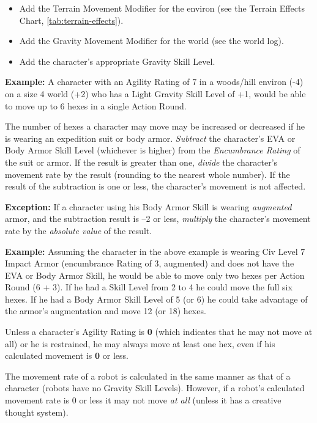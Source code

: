 \begin{itemize}
\item Add the Terrain Movement Modifier for the environ (see the
  Terrain Effects Chart, \ref{tab:terrain-effects}). 
\item Add the Gravity Movement Modifier for the world (see the world
  log). 
\item Add the character's appropriate Gravity Skill Level. 
\end{itemize}

\textbf{Example:} A character with an Agility Rating of 7 in a
woods/hill environ (-4) on a size 4 world (+2) who has a Light Gravity
Skill Level of +1, would be able to move up to 6 hexes in a single
Action Round.

The number of hexes a character may move may be increased or decreased
if he is wearing an expedition suit or body armor.  \emph{Subtract}
the character's EVA or Body Armor Skill Level (whichever is higher)
from the \emph{Encumbrance Rating} of the suit or armor. If the result
is greater than one, \emph{divide} the character's movement rate by
the result (rounding to the nearest whole number). If the result of
the subtraction is one or less, the character's movement is not
affected.

\textbf{Exception:} If a character using his Body Armor Skill is
wearing \emph{augmented} armor, and the subtraction result is --2 or
less, \emph{multiply} the character's movement rate by the
\emph{absolute value} of the result.

\textbf{Example:} Assuming the character in the above example is
wearing Civ Level 7 Impact Armor (encumbrance Rating of 3, augmented)
and does not have the EVA or Body Armor Skill, he would be able to
move only two hexes per Action Round (6 + 3). If he had a Skill
Level from 2 to 4 he could move the full six hexes. If he had a Body
Armor Skill Level of 5 (or 6) he could take advantage of the armor's
augmentation and move 12 (or 18) hexes.

Unless a character's Agility Rating is \textbf{0} (which indicates
that he may not move at all) or he is restrained, he may always move
at least one hex, even if his calculated movement is \textbf{0} or
less.

The movement rate of a robot is calculated in the same manner as that
of a character (robots have no Gravity Skill Levels). However, if a
robot's calculated movement rate is 0 or less it may not move \emph{at
  all} (unless it has a creative thought system).


